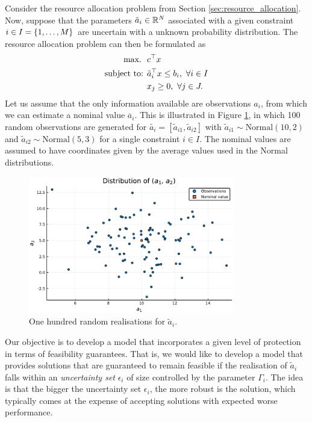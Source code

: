 \documentclass{article}
\begin{document}
Consider the resource allocation problem from Section \ref{sec:resource_allocation}. Now, suppose that the parameters $\tilde{a}_i \in \mathbb R^N $ associated with a given constraint $i \in I = \left\{ 1,\dots,M \right \}$ are uncertain with a unknown probability distribution. The resource allocation problem can then be formulated as
%
\begin{align*}
\mathop{\text{max.} \ } \ &  c^\top x  \\
\mbox{subject to: } & \tilde{a}_{i}^\top x \leq b_i, \ \forall i \in I  \\
& x_j \geq 0, \ \forall j \in J. 
\end{align*} 
%
Let us assume that the only information available are observations $\hat{a}_i$, from which we can estimate a nominal value $\overline{a}_i$. This is illustrated in Figure \ref{fig:random_obsservations}, in which 100 random observations are generated for $\tilde{a_i} = [\tilde{a}_{i1}, \tilde{a}_{i2}]$ with $\tilde{a}_{i1} \sim \text{Normal}(10,2)$ and $\tilde{a}_{i2} \sim \text{Normal}(5,3)$ for a single constraint $i \in I$. The nominal values are assumed to have coordinates given by the average values used in the Normal distributions. 
%
\begin{figure}[h]
\includegraphics[width=0.8\textwidth]{Figures/data_no_ellipsoid.pdf}
\caption{One hundred random realisations for $\tilde{a}_i$.} \label{fig:random_obsservations}
\end{figure}
%
Our objective is to develop a model that incorporates a given level of protection in terms of feasibility guarantees. That is, we would like to develop a model that provides solutions that are guaranteed to remain feasible if the realisation of $\tilde{a}_i$ falls within an \emph{uncertainty set} $\epsilon_i$ of size controlled by the parameter $\Gamma_i$. The idea is that the bigger the uncertainty set $\epsilon_i$, the more robust is the solution, which typically comes at the expense of accepting solutions with expected worse performance.
\end{document}
